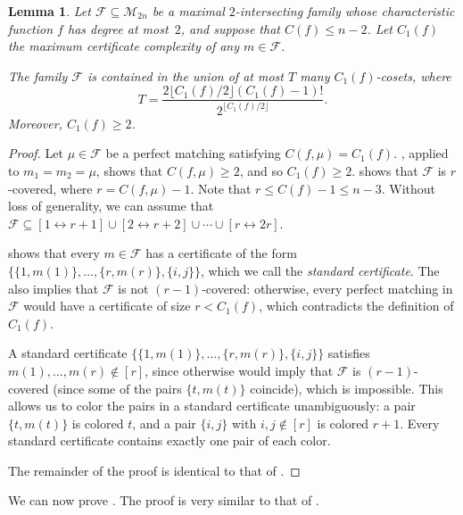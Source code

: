 \documentclass{article}
\newtheorem{lemma}[theorem]{Lemma}
\theoremstyle{definition}
\providecommand{\dcoset}[2]{[#1 \leftrightarrow #2]}
\providecommand{\cM}{\mathcal{M}}
\begin{document}
\begin{lemma} \label{lem:main-ub-pms}
Let $\mathcal{F} \subseteq \cM_{2n}$ be a maximal $2$-intersecting family whose characteristic function $f$ has degree at most~$2$, and suppose that $C(f) \leq n-2$. Let $C_1(f)$ the maximum certificate complexity of any $m \in \mathcal{F}$.

The family $\mathcal{F}$ is contained in the union of at most $T$ many $C_1(f)$-cosets, where
\[
 T = \frac{2\lfloor C_1(f)/2 \rfloor (C_1(f) - 1)!}{2^{\lfloor C_1(f)/2 \rfloor}}.
\]
Moreover, $C_1(f) \geq 2$.
\end{lemma}
\begin{proof}
Let $\mu \in \mathcal{F}$ be a perfect matching satisfying $C(f,\mu) = C_1(f)$. , applied to $m_1 = m_2 = \mu$, shows that $C(f,\mu) \geq 2$, and so $C_1(f) \geq 2$.  shows that $\mathcal{F}$ is $r$-covered, where $r = C(f,\mu) - 1$. Note that $r \leq C(f) - 1 \leq n - 3$. Without loss of generality, we can assume that $\mathcal{F} \subseteq \dcoset{1}{r+1} \cup \dcoset{2}{r+2} \cup \cdots \cup \dcoset{r}{2r}$.

 shows that every $m \in \mathcal{F}$ has a certificate of the form $\bigl\{\{1,m(1)\},\ldots,\{r,m(r)\},\{i,j\}\bigr\}$, which we call the \emph{standard certificate}. The  also implies that $\mathcal{F}$ is not $(r-1)$-covered: otherwise, every perfect matching in $\mathcal{F}$ would have a certificate of size $r < C_1(f)$, which contradicts the definition of $C_1(f)$.

A standard certificate $\bigl\{\{1,m(1)\},\ldots,\{r,m(r)\},\{i,j\}\bigr\}$ satisfies $m(1),\ldots,m(r) \notin [r]$, since otherwise  would imply that $\mathcal{F}$ is $(r-1)$-covered (since some of the pairs $\{t,m(t)\}$ coincide), which is impossible. This allows us to color the pairs in a standard certificate unambiguously: a pair $\{t,m(t)\}$ is colored $t$, and a pair $\{i,j\}$ with $i,j \notin [r]$ is colored $r+1$. Every standard certificate contains exactly one pair of each color.

The remainder of the proof is identical to that of .
\end{proof}

We can now prove . The proof is very similar to that of .
\end{document}
